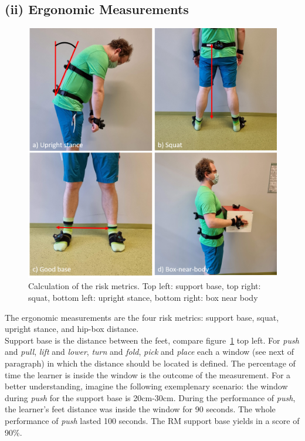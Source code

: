 \subsection{(ii) Ergonomic Measurements}
\begin{figure}[H]
	\centering
	\includegraphics[width=\textwidth]{figures/riskMeasurements.png}
	\caption[Risk metrics calculation.]{Calculation of the risk metrics. Top left: support base, top right: squat, bottom left: upright stance, bottom right: box near body}
	\label{fig:rmCalc}
\end{figure}
The ergonomic measurements are the four risk metrics: support base, squat, upright stance, and hip-box distance.\\
Support base is the distance between the feet, compare figure~\ref{fig:rmCalc} top left. For \textit{push} and \textit{pull}, \textit{lift} and \textit{lower}, \textit{turn} and \textit{fold}, \textit{pick} and \textit{place} each a window (see next of paragraph) in which the distance should be located is defined. The percentage of time the learner is inside the window is the outcome of the measurement. For a better understanding, imagine the following exemplenary  scenario: the window during \textit{push} for the support base is 20cm-30cm. During the performance of \textit{push}, the learner's feet distance was inside the window for 90 seconds. The whole performance of \textit{push} lasted 100 seconds. The RM support base yields in a score of 90\%.\\
